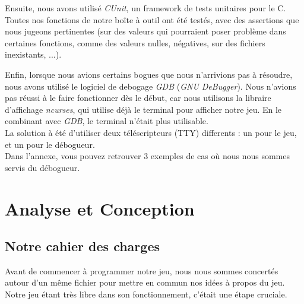 \documentclass[12pt]{report}
\begin{document}
		\vspace{12pt}
		
		Ensuite, nous avons utilisé \emph{CUnit}, un framework de tests unitaires pour le C. Toutes nos fonctions de notre boîte à outil ont été testés, avec des assertions que nous jugeons pertinentes (sur des valeurs qui pourraient poser problème dans certaines fonctions, comme des valeurs nulles, négatives, sur des fichiers inexistants, ...).
		
		\vspace{12pt}
		
		Enfin, lorsque nous avions certains bogues que nous n'arrivions pas à résoudre, nous avons utilisé le logiciel de debogage \emph{GDB} (\emph{GNU DeBugger}). Nous n'avions pas réussi à le faire fonctionner dès le début, car nous utilisons la libraire d'affichage \emph{ncurses}, qui utilise déjà le terminal pour afficher notre jeu. En le combinant avec \emph{GDB}, le terminal n'était plus utilisable.\\
		La solution à été d'utiliser deux téléscripteurs (\textsc{TTY}) differents : un pour le jeu, et un pour le débogueur.\\
		Dans l'annexe, vous pouvez retrouver 3 exemples de cas où nous nous sommes servis du débogueur.

\chapter{Analyse et Conception}

	\section{Notre cahier des charges}

	Avant de commencer à programmer notre jeu, nous nous sommes concertés autour d'un même fichier pour mettre en commun nos idées à propos du jeu. Notre jeu étant très libre dans son fonctionnement, c'était une étape cruciale.
	
		\vspace{12pt}
\end{document}
